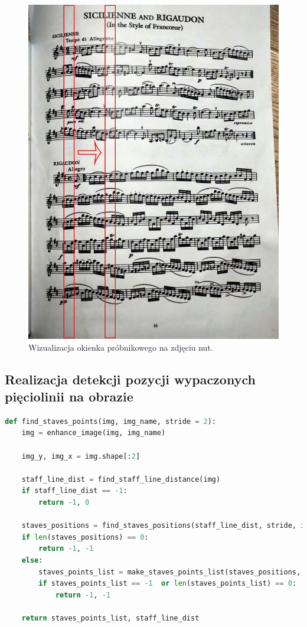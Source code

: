 \begin{figure}[H]
	\centering
	\includegraphics[width=12cm]{images/probe window demo.jpg}
	\caption{Wizualizacja okienka próbnikowego na zdjęciu nut.}
	\label{fig:probe_window_demo}
\end{figure}

\pagebreak

\subsection{Realizacja detekcji pozycji wypaczonych pięciolinii na obrazie}

\begin{lstlisting}[caption={\pyth|find_staves_points()| - funkcja odnajdywania pozycji pięciolinii na obrazie.}, label={find-staves-points}, language=Python]
def find_staves_points(img, img_name, stride = 2):
	img = enhance_image(img, img_name)
	
	img_y, img_x = img.shape[:2]
	
	staff_line_dist = find_staff_line_distance(img)
	if staff_line_dist == -1:
		return -1, 0
	
	staves_positions = find_staves_positions(staff_line_dist, stride, img)
	if len(staves_positions) == 0:
		return -1, -1
	else:
		staves_points_list = make_staves_points_list(staves_positions, staff_line_dist)
		if staves_points_list == -1  or len(staves_points_list) == 0:
			return -1, -1

	return staves_points_list, staff_line_dist
\end{lstlisting}

